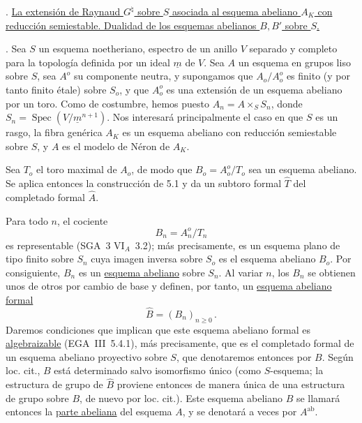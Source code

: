 
\medskip
{}. \underline{La extensión de Raynaud $G^\natural$ sobre $S$ asociada
al esquema abeliano $A_K$ con reducción semiestable. Dualidad de los
esquemas abelianos $B,B'$ sobre $S$.}

\medskip
{}. Sea $S$ un esquema noetheriano, espectro de un anillo $V$ separado
y completo para la topología definida por un ideal $\underline m$ de
$V$. Sea $A$ un esquema en grupos liso sobre $S$, sea $A^o$ su
componente neutra, y supongamos que $A_o/A_o^o$ es finito (y por tanto
finito étale) sobre $S_o$, y que $A_o^o$ es una extensión de un esquema
abeliano por un toro. Como de costumbre, hemos puesto
$A_n=A\times_S S_n$, donde
$S_n=\operatorname{Spec}(V/\underline m^{n+1})$. Nos interesará
principalmente el caso en que $S$ es un rasgo, la fibra genérica $A_K$
es un esquema abeliano con reducción semiestable sobre $S$, y $A$ es el
modelo de Néron de $A_K$.

Sea $T_o$ el toro maximal de $A_o$, de modo que
$B_o=A_o^o/T_o$ sea un esquema abeliano. Se aplica entonces la
construcción de 5.1 y da un subtoro formal $\widehat T$ del completado
formal $\widehat A$.


Para todo $n$, el cociente
\begin{equation}\tag{7.1.1}
 B_n=A_n^o/T_n
\end{equation}
es representable (SGA~3 $\mathrm{VI}_A$~3.2); más precisamente, es un
esquema plano de tipo finito sobre $S_n$ cuya imagen inversa sobre $S_o$
es el esquema abeliano $B_o$. Por consiguiente, $B_n$ es un
\underline{esquema abeliano} sobre $S_n$. Al variar $n$, los $B_n$ se
obtienen unos de otros por cambio de base y definen, por tanto, un
\underline{esquema abeliano formal}
\begin{equation}\tag{7.1.2}
 \widehat B=(B_n)_{n\geqslant0}\,.
\end{equation}
Daremos condiciones que implican que este esquema abeliano formal es
\underline{algebraizable} (EGA~III~5.4.1), más precisamente, que es el
completado formal de un esquema abeliano proyectivo sobre $S$, que
denotaremos entonces por $B$. Según loc. cit., $B$ está determinado
salvo isomorfismo único (como $S$-esquema; la estructura de grupo de
$\widehat B$ proviene entonces de manera única de una estructura de
grupo sobre $B$, de nuevo por loc. cit.). Este esquema abeliano $B$ se
llamará entonces la \underline{parte abeliana} del esquema $A$, y se
denotará a veces por $A^{\mathrm{ab}}$.

